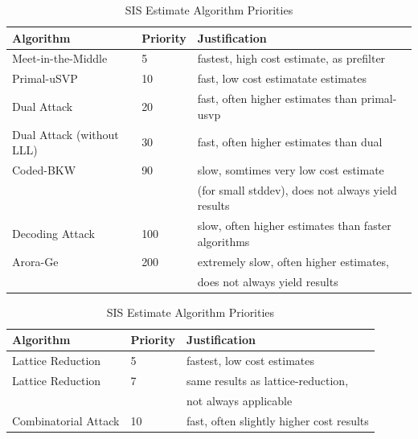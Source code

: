\begin{table}
    \centering
    \begin{tabular}[]{lll}
        \toprule
        Algorithm                 & Priority & Justification                                       \\\hline
        Meet-in-the-Middle        & 5        & fastest, high cost estimate, as prefilter           \\
        Primal-uSVP               & 10       & fast, low cost estimatate estimates                 \\
        Dual Attack               & 20       & fast, often higher estimates than primal-usvp       \\
        Dual Attack (without LLL) & 30       & fast, often higher estimates than dual              \\
        Coded-BKW                 & 90       & slow, somtimes very low cost estimate               \\
                                  &          & (for small stddev), does not always yield results   \\
        Decoding Attack           & 100      & slow, often higher estimates than faster algorithms \\
        Arora-Ge                  & 200      & extremely slow, often higher estimates,             \\
                                  &          & does not always yield results                       \\
        \bottomrule
    \end{tabular}
    \caption{LWE Estimate Algorithm Priorities}\label{tab:lwe-alg-prio}
    \vspace{1cm}
    \begin{tabular}[]{lll}
        \toprule
        Algorithm                     & Priority & Justification                            \\\hline
        Lattice Reduction \cite{MR09} & 5        & fastest, low cost estimates              \\
        Lattice Reduction \cite{RS10} & 7        & same results as lattice-reduction,       \\
                                      &          & not always applicable                    \\
        Combinatorial Attack          & 10       & fast, often slightly higher cost results \\
        \bottomrule
    \end{tabular}
    \caption{SIS Estimate Algorithm Priorities}\label{tab:sis-alg-prio}
\end{table}

